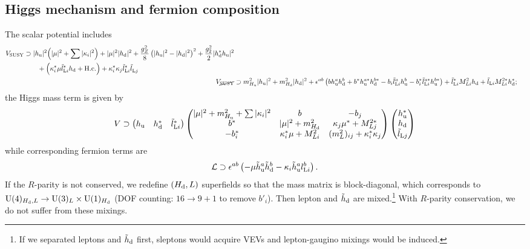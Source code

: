 \documentclass[CheatSheet]{subfiles}
\begin{document}
\subsection{Higgs mechanism and fermion composition}
The scalar potential includes
\begin{align}
\begin{split}
 V\w{SUSY}&\supset
 |\hu|^2\Bigl( |\mu|^2 + \sum|\kappa_i|^2 \Bigr)
 + |\mu|^2|\hd|^2
 + \frac{g_Z^2}{8}\left(|\hu|^2 - |\hd|^2\right)^2
 + \frac{g_2^2}{2}|\hd^{*}\hu|^2
\\&\qquad
 + \Bigl( \kappa^*_{i}\mu\tlL[i]^{*}\hd + \text{H.c.} \Bigr)
 + \kappa^{*}_{i}\kappa_{j}\tlL[i]^{*}\tlL[j]^{}
\end{split}
\\
V_{\text{\cancel{SUSY}}}&\supset
       m^2_{\Hu}|\hu|^2 + m^2_{\Hd}|\hd|^2 +\epsilon^{ab}\left(b\hu^a\hd^b + b^*\hu^{a*}\hd^{b*}
       -b_i\tlL[i]^a\hu^b-b_i^*\tlL[i]^{a*}\hu^{b*}\right)+\tlL[i]^*M^{2}_{Li}\hd + \tlL[i]M^{2*}_{Li}\hd^*;
\end{align}
the Higgs mass term is given by
\begin{equation}
 V\supset\pmat{\hu &\hd^* &\tlL[i]^*}
\pmat{
  |\mu|^2+m^2_{\Hu}+\sum|\kappa_i|^2 & b & -b_j\\
  b^* & |\mu|^2+m^2_{\Hd} & \kappa_j\mu^*+M^{2*}_{Lj}\\
  -b_i^* & \kappa_i^*\mu+M^{2}_{Li} & (m_L^2)_{ij} + \kappa_i^*\kappa_j
}
\pmat{\hu^* \\\hd\\\tlL[j]}
\end{equation}
while corresponding fermion terms are
\begin{equation}
 \mathcal L\supset \epsilon^{ab}\left(
  -\mu\thu^a\thd^b-\kappa_i\thu^a\lL[i]^b
\right).
\end{equation}
If the $R$-parity is not conserved, we redefine $(\Hd, L)$ superfields so that the mass matrix is block-diagonal, which corresponds to $\gU(4)_{\Hd,L}\to\gU(3)_L\times\gU(1)_{\Hd}$ (DOF counting: $16\to9+1$ to remove $b'_i$).
Then lepton and $\thd$ are mixed.\footnote{If we separated leptons and $\thd$ first, sleptons would acquire VEVs and lepton-gaugino mixings would be induced.}
With $R$-parity conservation, we do not suffer from these mixings.
\end{document}
